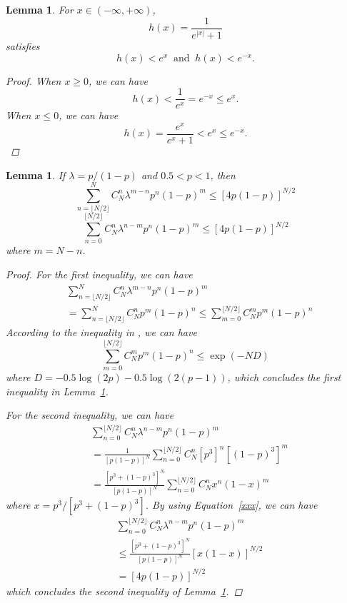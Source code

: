 \documentclass{article}
\newtheorem{lemma}[theorem]{Lemma}
\begin{document}
\begin{lemma}
\label{Concave2}
For $x\in(-\infty, +\infty)$, 
$$h(x)=\frac{1}{e^{|x|}+1}$$
satisfies
$$h(x)< e^x \;\;\mathrm{and}\;\; h(x)< e^{-x}.$$
\begin{proof}
When $x\geq 0$, we can have
\begin{equation}
h(x)<\frac{1}{e^x}=e^{-x}\leq e^{x}.
\end{equation}
When $x\leq 0$, we can have
\begin{equation}
h(x)=\frac{e^x}{e^x+1}<e^{x}\leq e^{-x}.
\end{equation}
\end{proof}
\end{lemma}

\begin{lemma}
\label{Concave3}
If $\lambda=p/(1-p)$ and $0.5<p<1$, then
$${\sum}_{n=\lfloor N/2 \rfloor}^{N}C_N^n\lambda^{m-n}p^n(1-p)^m\leq [4p(1-p)]^{N/2}$$
$${\sum}_{n=0}^{\lfloor N/2 \rfloor}C_N^n\lambda^{n-m}p^n(1-p)^m\leq [4p(1-p)]^{N/2}$$
where $m=N-n$.
\begin{proof}
For the first inequality, we can have
\begin{align}
&\sum_{n=\lfloor N/2 \rfloor}^{N}C_N^n\lambda^{m-n}p^n(1-p)^m \\&=\sum_{n=\lfloor N/2 \rfloor}^{N}C_N^np^m(1-p)^n\leq \sum_{m=0}^{\lfloor N/2 \rfloor}C_N^m p^m(1-p)^n\nonumber
\end{align}
According to the inequality in \cite{Arratia1989}, we can have
\begin{equation}
\label{xxx}
 \sum_{m=0}^{\lfloor N/2 \rfloor}C_N^m p^m(1-p)^n \leq \exp (-ND)
\end{equation}
where $D=-0.5\log(2p)-0.5\log(2(p-1))$, which concludes the first inequality in Lemma~\ref{Concave3}.

For the second inequality, we can have
\begin{equation}
\begin{split}
&\sum_{n=0}^{\lfloor N/2 \rfloor}C_N^n\lambda^{n-m}p^n(1-p)^m \\
&= \frac{1}{[p(1-p)]^N}\sum_{n=0}^{\lfloor N/2 \rfloor}C_N^n[p^3]^n[(1-p)^3]^m
 \\&=\frac{[p^3+(1-p)^3]^N}{[p(1-p)]^N}\sum_{n=0}^{\lfloor N/2 \rfloor}C_N^n x^n(1-x)^m
\end{split}
\end{equation}
where $x=p^3/[p^3+(1-p)^3]$. By using Equation~\ref{xxx}, we can have
\begin{equation}
\begin{split}
&\sum_{n=0}^{\lfloor N/2 \rfloor}C_N^n\lambda^{n-m}p^n(1-p)^m\\
&\leq \frac{[p^3+(1-p)^3]^N}{[p(1-p)]^N} [x(1-x)]^{N/2} \\
&=[4p(1-p)]^{N/2}
\end{split}
\end{equation}
which concludes the second inequality of Lemma~\ref{Concave3}.
\end{proof}
\end{lemma}
\end{document}
